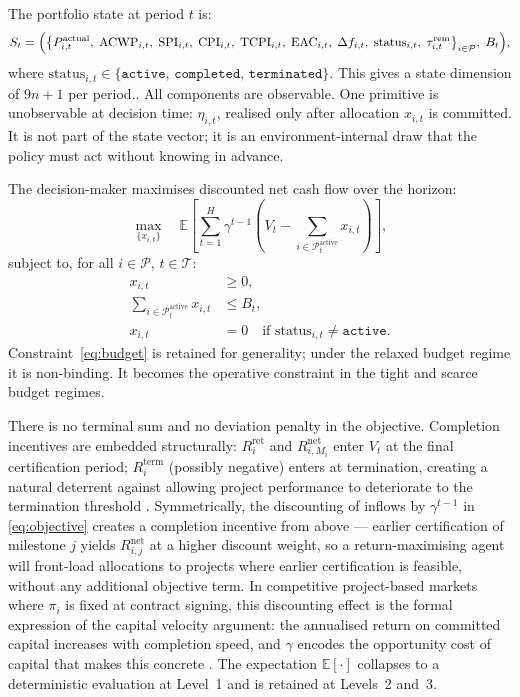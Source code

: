 The portfolio state at period $t$ is:
\begin{equation}
  S_t = \Bigl(
    \bigl\{
      P_{i,t}^{\mathrm{actual}},\;
      \mathrm{ACWP}_{i,t},\;
      \mathrm{SPI}_{i,t},\;
      \mathrm{CPI}_{i,t},\;
      \mathrm{TCPI}_{i,t},\;
      \mathrm{EAC}_{i,t},\;
      \Delta f_{i,t},\;
      \mathrm{status}_{i,t},\;
      \tau_{i,t}^{\mathrm{rem}}
    \bigr\}_{i \in \mathcal{P}},\;
    B_t
  \Bigr),
  \label{eq:state}
\end{equation}
where $\mathrm{status}_{i,t} \in \{\texttt{active},\,
\texttt{completed},\, \texttt{terminated}\}$. This gives a state
dimension of $9n + 1$ per period.. All components are observable.
One primitive is unobservable at decision time: $\eta_{i,t}$, realised
only after allocation $x_{i,t}$ is committed. It is not part of the
state vector; it is an environment-internal draw that the policy must
act without knowing in advance.

The decision-maker maximises discounted net cash flow over the horizon:
\begin{equation}
  \max_{\{x_{i,t}\}} \quad
  \mathbb{E}\!\left[
    \sum_{t=1}^{H} \gamma^{t-1}
    \!\left(
      V_t
      - \sum_{i \in \mathcal{P}_t^{\mathrm{active}}} x_{i,t}
    \right)
  \right],
  \label{eq:objective}
\end{equation}
subject to, for all $i \in \mathcal{P}$, $t \in \mathcal{T}$:
\begin{align}
  x_{i,t} &\geq 0,
  \label{eq:nonnegativity} \\
  \sum_{i \in \mathcal{P}_t^{\mathrm{active}}} x_{i,t} &\leq B_t,
  \label{eq:budget} \\
  x_{i,t} &= 0
    \quad \text{if } \mathrm{status}_{i,t} \neq \texttt{active}.
  \label{eq:inactive}
\end{align}
Constraint~\eqref{eq:budget} is retained for generality; under the
relaxed budget regime it is non-binding. It becomes the operative
constraint in the tight and scarce budget regimes.

There is no terminal sum and no deviation penalty in the objective.
Completion incentives are embedded structurally: $R_i^{\mathrm{ret}}$
and $R_{i,M_i}^{\mathrm{net}}$ enter $V_t$ at the final certification
period; $R_i^{\mathrm{term}}$ (possibly negative) enters at termination,
creating a natural deterrent against allowing project performance to
deteriorate to the termination threshold \citep{Ng1999}. Symmetrically,
the discounting of inflows by $\gamma^{t-1}$ in \eqref{eq:objective}
creates a completion incentive from above --- earlier certification of
milestone $j$ yields $R_{i,j}^{\mathrm{net}}$ at a higher discount
weight, so a return-maximising agent will front-load allocations to
projects where earlier certification is feasible, without any additional
objective term. In competitive project-based markets where $\pi_i$ is
fixed at contract signing, this discounting effect is the formal
expression of the capital velocity argument: the annualised return on
committed capital increases with completion speed, and $\gamma$ encodes
the opportunity cost of capital that makes this concrete
\citep{Damodaran2012}. The expectation
$\mathbb{E}[\cdot]$ collapses to a deterministic evaluation at Level~1
and is retained at Levels~2 and~3.

